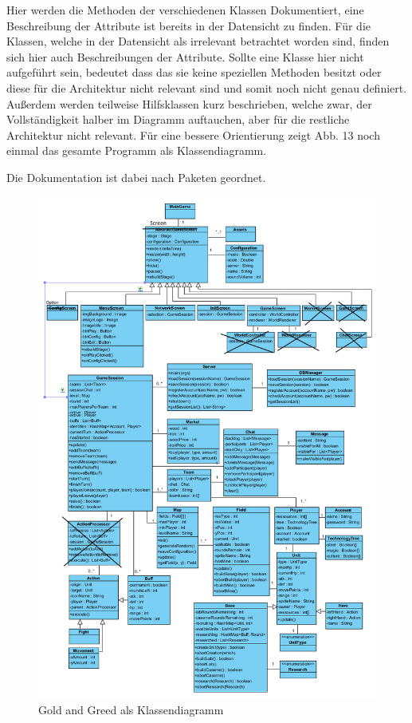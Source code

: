 \documentclass[fontsize=12pt,paper=a4,twoside]{scrartcl}
\begin{document}
\label{sec:dokumentation}

Hier werden die Methoden der verschiedenen Klassen Dokumentiert, eine Beschreibung der Attribute ist bereits in der Datensicht zu finden. Für die Klassen, welche in der Datensicht als irrelevant betrachtet worden sind, finden sich hier auch Beschreibungen der Attribute. Sollte eine Klasse hier nicht aufgeführt sein, bedeutet dass das sie keine speziellen Methoden besitzt oder diese für die Architektur nicht relevant sind und somit noch nicht genau definiert. Außerdem werden teilweise Hilfsklassen kurz beschrieben, welche zwar, der Vollständigkeit halber im Diagramm auftauchen, aber für die restliche Architektur nicht relevant. Für eine bessere Orientierung zeigt Abb. 13 noch einmal das gesamte Programm als Klassendiagramm.

Die Dokumentation ist dabei nach Paketen geordnet.

\begin{figure}[h]
\centering
\includegraphics[width=1.0\linewidth]{ClassDiagram1}
\caption{Gold and Greed als Klassendiagramm}
\label{fig:ClassDiagram1}
\end{figure}
\end{document}
